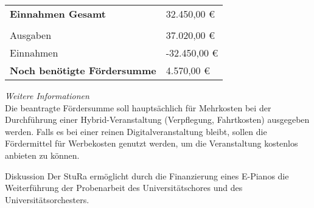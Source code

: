 {\begin{longtable}{p{12cm} p{3cm}}
        \textbf{Einnahmen Gesamt} & 32.450,00 €\\
        \\
        Ausgaben & 37.020,00 €\\
        Einnahmen & -32.450,00 €\\
        \textbf{Noch benötigte Fördersumme} & 4.570,00 €\\
    \end{longtable}
    \vspace*{2em}
    \emph{Weitere Informationen}\\
    Die beantragte Fördersumme soll hauptsächlich für Mehrkosten bei der Durchführung einer Hybrid-Veranstaltung (Verpflegung, Fahrtkosten) ausgegeben werden. Falls es bei einer reinen Digitalveranstaltung bleibt, sollen die Fördermittel für Werbekosten genutzt werden, um die Veranstaltung kostenlos anbieten zu können.
}{
    Diskussion
}
{
    Der StuRa ermöglicht durch die Finanzierung eines E-Pianos die Weiterführung der Probenarbeit des Universitätschores und des Universitätsorchesters.
}
